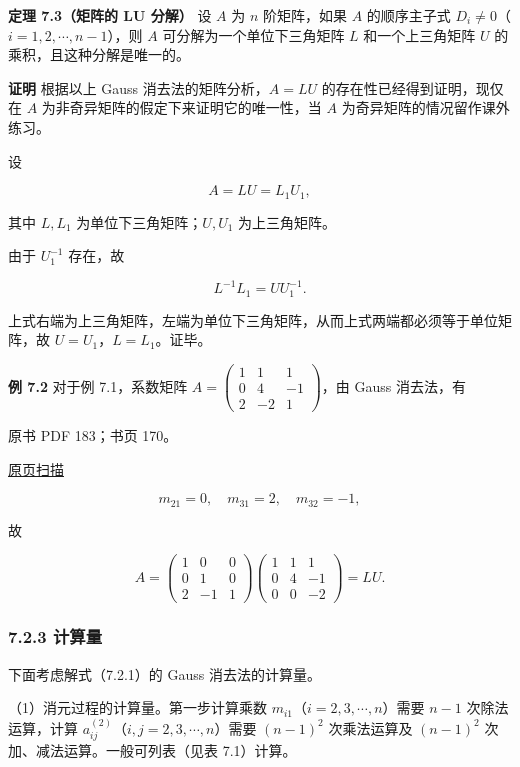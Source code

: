 \documentclass[
  10pt,
  fontset=fandol]{ctexart}
\begin{document}
\textbf{定理 7.3（矩阵的 LU 分解）} 设 \(A\) 为 \(n\) 阶矩阵，如果 \(A\) 的顺序主子式 \(D_i\ne0\)（\(i=1,2,\cdots,n-1\)），则 \(A\) 可分解为一个单位下三角矩阵 \(L\) 和一个上三角矩阵 \(U\) 的乘积，且这种分解是唯一的。

\textbf{证明} 根据以上 Gauss 消去法的矩阵分析，\(A=LU\) 的存在性已经得到证明，现仅在 \(A\) 为非奇异矩阵的假定下来证明它的唯一性，当 \(A\) 为奇异矩阵的情况留作课外练习。

设

\[A=LU=L_1U_1,\]

其中 \(L,L_1\) 为单位下三角矩阵；\(U,U_1\) 为上三角矩阵。

由于 \(U_1^{-1}\) 存在，故

\[L^{-1}L_1=UU_1^{-1}.\]

上式右端为上三角矩阵，左端为单位下三角矩阵，从而上式两端都必须等于单位矩阵，故 \(U=U_1\)，\(L=L_1\)。证毕。

\textbf{例 7.2} 对于例 7.1，系数矩阵 \(A=\begin{pmatrix}1&1&1\\0&4&-1\\2&-2&1\end{pmatrix}\)，由 Gauss 消去法，有

\clearpage

原书 PDF 183；书页 170。

\href{../../../source-images/pdf-183.jpeg}{原页扫描}

\[m_{21}=0,\quad m_{31}=2,\quad m_{32}=-1,\]

故

\[
A=\begin{pmatrix}1&0&0\\0&1&0\\2&-1&1\end{pmatrix}
\begin{pmatrix}1&1&1\\0&4&-1\\0&0&-2\end{pmatrix}=LU.
\]

\subsubsection{7.2.3 计算量}\label{ux8ba1ux7b97ux91cf}

下面考虑解式（7.2.1）的 Gauss 消去法的计算量。

（1）消元过程的计算量。第一步计算乘数 \(m_{i1}\)（\(i=2,3,\cdots,n\)）需要 \(n-1\) 次除法运算，计算 \(a_{ij}^{(2)}\)（\(i,j=2,3,\cdots,n\)）需要 \((n-1)^2\) 次乘法运算及 \((n-1)^2\) 次加、减法运算。一般可列表（见表 7.1）计算。
\end{document}
